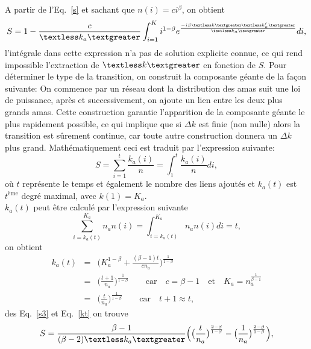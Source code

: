 A partir de l'Eq.~\eqref{s} et sachant que $n(i)=ci^{\beta}$, on obtient
\begin{equation}
S=1-\frac{c}{\kma}\int_{i=1}^Ki^{1-\beta}e^{\frac{-iS\km\kmap}{\kma}}di
\label{s2},
\end{equation}
l'intégrale dans cette expression n'a pas de solution explicite connue, ce qui rend  impossible l'extraction de $\km$ en fonction de $S$. 
Pour déterminer le type de la transition, on construit la composante géante de la façon suivante:
On commence par un réseau dont la distribution des amas suit une loi de puissance, après et successivement, on ajoute un lien entre les deux plus 
grands amas. Cette construction garantie l'apparition de la composante géante le plus rapidement possible, ce qui implique que si $\Delta k$ est finie (non nulle) alors la transition est sûrement continue, car toute autre construction donnera un $\Delta k$ plus grand. Mathématiquement ceci est traduit par l'expression suivante: 
\begin{equation}
S=\sum_{i=1}^t\frac{k_a(i)}{n}=\int_{1}^{t}\frac{k_a(i)}{n}di,
\label{s3}
\end{equation}
où $t$ représente le temps et également le nombre des liens ajoutés et $k_a(t)$ est $t^{\text{ème}}$ degré maximal, avec $k(1)=K_a$.\\
$k_a(t)$ peut être calculé par l'expression suivante
\begin{equation}
\sum_{i=k_a (t)}^{K_a} n_an(i)=\int_{i=k_a(t)}^{K_a}n_an(i)di=t,
\end{equation}
on obtient
\begin{eqnarray}
k_a(t)&=&\Big(K_a^{1-\beta}+\frac{(\beta-1)t}{cn_a}\Big)^{\frac{1}{1-\beta}}\nonumber\\
&=& \Big(\frac{t+1}{n_a}\Big)^{\frac{1}{1-\beta}} \quad \quad  \text{car} \quad c=\beta-1 \quad \text{et} \quad K_a=n_a^{\frac{1}{\beta-1}} \nonumber\\
&=& \Big(\frac{t}{n_a}\Big)^{\frac{1}{1-\beta}}
\quad \quad  \text{car} \quad t+1\approx t,
\label{kt}
\end{eqnarray}
des Eq.~\eqref{s3} et Eq.~\eqref{kt} on trouve
\begin{equation}
S=\frac{\beta-1}{(\beta-2)\kma}\Big(\big(\frac{t}{n_a}\big)^{\frac{2-\beta}{1-\beta}}-\big(\frac{1}{n_a}\big)^{\frac{2-\beta}{1-\beta}}\Big),
\label{s4}
\end{equation}

